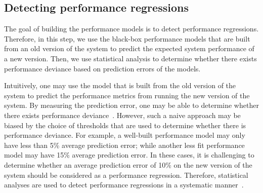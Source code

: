 \subsection{Detecting performance regressions} \label{sec:comparions-approaches}

The goal of building the performance models is to detect performance regressions. Therefore, in this step, we use the black-box performance models that are built from an old version of the system to predict the expected system performance of a new version. Then, we use statistical analysis to determine whether there exists performance deviance based on prediction errors of the models.

Intuitively, one may use the model that is built from the old version of the system to predict the performance metrics from running the new version of the system. By measuring the prediction error, one may be able to determine whether there exists performance deviance~\citep{DBLP:conf/osdi/CohenCGKS04,DBLP:conf/wosp/NguyenAJHNF12}. However, such a naive approach may be biased by the choice of thresholds that are used to determine whether there is performance deviance. For example, a well-built performance model may only have less than 5\% average prediction error; while another less fit performance model may have 15\% average prediction error. In these cases, it is challenging to determine whether an average prediction error of 10\% on the new version of the system should be considered as a performance regression. Therefore, statistical analyses are used to detect performance regressions in a systematic manner~\citep{DBLP:conf/icst/GaoJBL16,DBLP:conf/wosp/ShangHNF15,Foo:2015:ICS:2819009.2819034}. 

